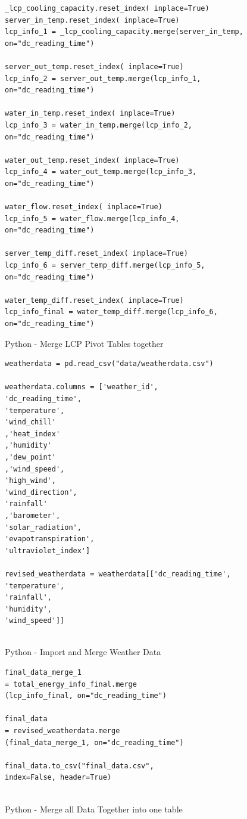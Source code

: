 \documentclass[12pt]{scrartcl}
\begin{document}
\begin{listing}[H]
\begin{verbatim}
_lcp_cooling_capacity.reset_index( inplace=True)
server_in_temp.reset_index( inplace=True)
lcp_info_1 = _lcp_cooling_capacity.merge(server_in_temp, 
on="dc_reading_time")

server_out_temp.reset_index( inplace=True)
lcp_info_2 = server_out_temp.merge(lcp_info_1, 
on="dc_reading_time")

water_in_temp.reset_index( inplace=True)
lcp_info_3 = water_in_temp.merge(lcp_info_2, 
on="dc_reading_time")

water_out_temp.reset_index( inplace=True)
lcp_info_4 = water_out_temp.merge(lcp_info_3, 
on="dc_reading_time")

water_flow.reset_index( inplace=True)
lcp_info_5 = water_flow.merge(lcp_info_4, 
on="dc_reading_time")

server_temp_diff.reset_index( inplace=True)
lcp_info_6 = server_temp_diff.merge(lcp_info_5, 
on="dc_reading_time")

water_temp_diff.reset_index( inplace=True)
lcp_info_final = water_temp_diff.merge(lcp_info_6, 
on="dc_reading_time")

\end{verbatim}
\caption{Python - Merge LCP Pivot Tables together}
\label{list:[Python - Merge LCP Pivot Tables together]}
\end{listing}

\begin{listing}[H]
\begin{verbatim}
weatherdata = pd.read_csv("data/weatherdata.csv")

weatherdata.columns = ['weather_id',
'dc_reading_time',
'temperature',
'wind_chill'
,'heat_index'
,'humidity'
,'dew_point'
,'wind_speed',
'high_wind',
'wind_direction',
'rainfall'
,'barometer',
'solar_radiation',
'evapotranspiration',
'ultraviolet_index']

revised_weatherdata = weatherdata[['dc_reading_time',
'temperature',
'rainfall',
'humidity',
'wind_speed']]


\end{verbatim}
\caption{Python - Import and Merge Weather Data}
\label{list:[Python - Import and Merge Weather Data]}
\end{listing}

\begin{listing}[H]
\begin{verbatim}
final_data_merge_1 
= total_energy_info_final.merge
(lcp_info_final, on="dc_reading_time")

final_data 
= revised_weatherdata.merge
(final_data_merge_1, on="dc_reading_time")

final_data.to_csv("final_data.csv", 
index=False, header=True)


\end{verbatim}
\caption{Python - Merge all Data Together into one table}
\label{list:[Python - Merge all Data Together into one table]}
\end{listing}
\end{document}
